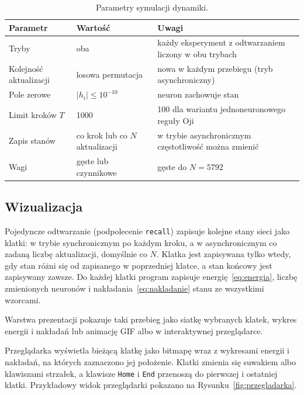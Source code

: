 \begin{table}[H]
    \centering
    \caption{Parametry symulacji dynamiki.}
    \label{tab:parametry-dynamiki}
    \small
    \begin{tabularx}{\textwidth}{l l X}
        \toprule
        Parametr & Wartość & Uwagi \\
        \midrule
        Tryby & oba & każdy eksperyment z odtwarzaniem liczony w obu trybach \\
        Kolejność aktualizacji & losowa permutacja & nowa w każdym przebiegu (tryb asynchroniczny) \\
        Pole zerowe & $\lvert h_i \rvert \le 10^{-10}$ & neuron zachowuje stan \\
        Limit kroków $T$ & \num{1000} & \num{100} dla wariantu jednoneuronowego reguły Oji \\
        Zapis stanów & co krok lub co $N$ aktualizacji & w trybie asynchronicznym częstotliwość można zmienić \\
        Wagi & gęste lub czynnikowe & gęste do $N = 5792$ \\
        \bottomrule
    \end{tabularx}
\end{table}

\subsection{Wizualizacja}
\label{sec:wizualizacja}

Pojedyncze odtwarzanie (podpolecenie \texttt{recall}) zapisuje kolejne stany sieci jako klatki: w trybie synchronicznym po każdym kroku, a w asynchronicznym co zadaną liczbę aktualizacji, domyślnie co $N$. Klatka jest zapisywana tylko wtedy, gdy stan różni się od zapisanego w poprzedniej klatce, a stan końcowy jest zapisywany zawsze. Do każdej klatki program zapisuje energię~\eqref{eq:energia}, liczbę zmienionych neuronów i nakładania~\eqref{eq:nakladanie} stanu ze wszystkimi wzorcami.

Warstwa prezentacji pokazuje taki przebieg jako siatkę wybranych klatek, wykres energii i nakładań lub animację GIF albo w interaktywnej przeglądarce.

Przeglądarka wyświetla bieżącą klatkę jako bitmapę wraz z wykresami energii i nakładań, na których zaznaczono jej położenie. Klatki zmienia się suwakiem albo klawiszami strzałek, a klawisze \texttt{Home} i \texttt{End} przenoszą do pierwszej i ostatniej klatki. Przykładowy widok przeglądarki pokazano na Rysunku~\ref{fig:przegladarka}.

